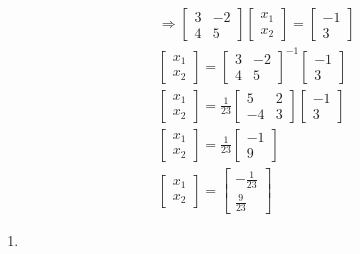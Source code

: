 \documentclass[
  letterpaper,
  DIV=11,
  numbers=noendperiod]{scrartcl}
\begin{document}
\begin{align*}
&\Rightarrow \begin{bmatrix}3 & -2 \\ 4 & 5\end{bmatrix}\begin{bmatrix}x_1 \\ x_2\end{bmatrix}=\begin{bmatrix}-1 \\ 3\end{bmatrix} \\
& \begin{bmatrix}x_1 \\ x_2\end{bmatrix}=\begin{bmatrix}3 & -2 \\ 4 & 5\end{bmatrix}^{-1}\begin{bmatrix}-1 \\ 3\end{bmatrix} \\
& \begin{bmatrix}x_1 \\ x_2\end{bmatrix}=\frac{1}{23}\begin{bmatrix}5 & 2 \\ -4 & 3\end{bmatrix}\begin{bmatrix}-1 \\ 3\end{bmatrix} \\
& \begin{bmatrix}x_1 \\ x_2\end{bmatrix}=\frac{1}{23}\begin{bmatrix}-1 \\ 9\end{bmatrix} \\
& \begin{bmatrix}x_1 \\ x_2\end{bmatrix}=\begin{bmatrix}-\frac{1}{23} \\ \frac{9}{23}\end{bmatrix}
\end{align*}

\begin{enumerate}
\def\labelenumi{\arabic{enumi})}
\setcounter{enumi}{1}
\item
\end{enumerate}
\end{document}
